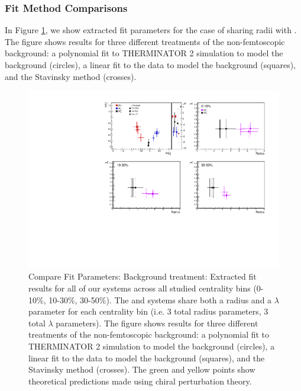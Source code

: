 \documentclass[/home/jesse/Analysis/FemtoAnalysis/AnalysisNotes/AnalysisNoteJBuxton.tex]{subfiles}
\begin{document}
\subsubsection{Fit Method Comparisons}
\label{ResultsLamK_FitMethComp}

In Figure \ref{fig:FitResults_ShareR_Sharelam_PolyBgd}, we show extracted fit parameters for the case of \LamKchPALamKchM sharing radii with \LamKchMALamKchP.  The figure shows results for three different treatments of the non-femtoscopic background: a polynomial fit to THERMINATOR 2 simulation to model the background (circles), a linear fit to the data to model the background (squares), and the Stavinsky method (crosses).


\begin{figure}[h]
  \centering
  \includegraphics[width=\textwidth]{7_ResultsAndDiscussion/Figures/New/CompareAllScattParamswSys_Comp3An_LinrPolyStav_10fm_StatOnly.pdf}
  \caption[Compare Fit Parameters: Background treatment]{Compare Fit Parameters: Background treatment: Extracted fit results for all of our \LamALamKpm systems across all studied centrality bins (0-10\%, 10-30\%, 30-50\%).  The \LamKchPALamKchM and \LamKchMALamKchP systems share both a radius and a $\lambda$ parameter for each centrality bin (i.e. 3 total radius parameters, 3 total $\lambda$ parameters).  The figure shows results for three different treatments of the non-femtoscopic background: a polynomial fit to THERMINATOR 2 simulation to model the background (circles), a linear fit to the data to model the background (squares), and the Stavinsky method (crosses).  The green \cite{Liu:2006xja} and yellow \cite{Mai:2009ce} points show theoretical predictions made using chiral perturbation theory.}
  \label{fig:FitResults_ShareR_Sharelam_PolyBgd}
\end{figure}
\end{document}
